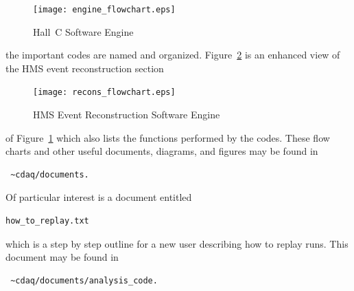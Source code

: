 \begin{figure}
\texttt{[image: engine\_flowchart.eps]}
\caption{Hall~C Software Engine}
\label{fig:7.8}
\end{figure}

the important codes are named and organized.
Figure~\ref{fig:7.9} is an enhanced view of the HMS event reconstruction section

\begin{figure}
\texttt{[image: recons\_flowchart.eps]}
\caption{HMS Event Reconstruction Software Engine\label{fig:7.9} }
\end{figure}

of Figure~\ref{fig:7.8} which also lists the functions performed by the codes.
These flow charts and other useful documents, diagrams, and
figures may be found in
\begin{verbatim} ~cdaq/documents. \end{verbatim}

Of particular interest is a document entitled \begin{verbatim}
how_to_replay.txt \end{verbatim}
which
is a step by step outline for a new user describing how to replay runs.
This document may be found in
\begin{verbatim} ~cdaq/documents/analysis_code. \end{verbatim}



